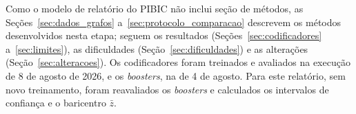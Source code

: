 Como o modelo de relatório do PIBIC não inclui seção de métodos, as Seções~\ref{sec:dados_grafos} a~\ref{sec:protocolo_comparacao} descrevem os métodos desenvolvidos nesta etapa; seguem os resultados (Seções~\ref{sec:codificadores} a~\ref{sec:limites}), as dificuldades (Seção~\ref{sec:dificuldades}) e as alterações (Seção~\ref{sec:alteracoes}). Os codificadores foram treinados e avaliados na execução de 8 de agosto de 2026, e os \textit{boosters}, na de 4 de agosto. Para este relatório, sem novo treinamento, foram reavaliados os \textit{boosters} e calculados os intervalos de confiança e o baricentro $\bar{z}$.
